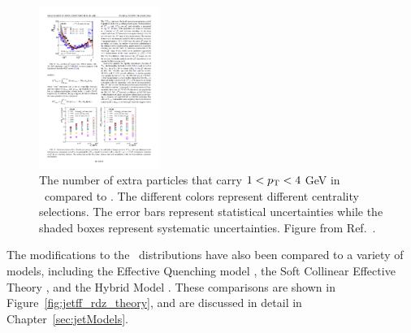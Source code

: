 

\begin{figure}[htbp]
\begin{center}
\includegraphics[width=0.35\textwidth]{figures/jetMeasurements/jetff_nch}
\caption{The number of extra particles that carry $1<\mbox{$p_{\mathrm{T}}$}<4$ GeV  in \pbpb\ compared to \pp.
The different colors represent different centrality selections.
The error bars represent statistical uncertainties while the shaded boxes represent systematic uncertainties.
Figure from Ref.~\cite{PhysRevC.98.024908}.}
\label{fig:jetff_nch}
\end{center}
\end{figure}

The modifications to the \Dz\ distributions have also been compared to a variety of models, including the Effective Quenching model \cite{Spousta:2015fca}, the Soft Collinear Effective Theory \cite{Chien:2015vja, Kang:2017frl}, and the Hybrid Model \cite{Casalderrey-Solana:2014bpa}.
These comparisons are shown in Figure~\ref{fig:jetff_rdz_theory}, and are discussed in detail in Chapter~\ref{sec:jetModels}.

